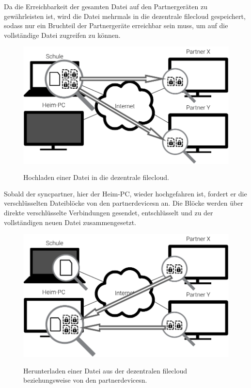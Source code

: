 Da die Erreichbarkeit der gesamten Datei auf den Partnergeräten zu gewährleisten
ist, wird die Datei mehrmals
in die dezentrale \gls{filecloud} gespeichert, sodass nur ein Bruchteil der
Partnergeräte erreichbar sein muss, um auf die vollständige Datei zugreifen zu
können.

\begin{figure}[htb]
	\centering
  \includegraphics[]{images/sblit_upload}
	\label{sblit_upload}
  \caption{Hochladen einer Datei in die dezentrale \gls{filecloud}.}
\end{figure}

Sobald der \gls{syncpartner}, hier der Heim-PC, wieder hochgefahren ist, fordert er die
verschlüsselten Dateiblöcke von den \glspl{partnerdevice}n an. Die Blöcke werden über
direkte verschlüsselte Verbindungen gesendet, entschlüsselt und zu der
vollständigen neuen Datei zusammengesetzt.

\begin{figure}[htb]
	\centering
  \includegraphics[]{images/sblit_download}
	\label{sblit_download}
  \caption{Herunterladen einer Datei aus der dezentralen \gls{filecloud} beziehungsweise
	von den \glspl{partnerdevice}n.}
\end{figure}
